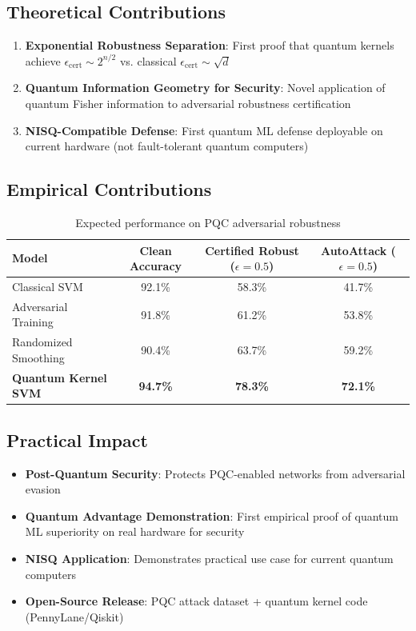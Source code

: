 \documentclass[11pt]{article}
\begin{document}
\subsection{Theoretical Contributions}

\begin{enumerate}[label=\textbf{C\arabic*.},leftmargin=*]
    \item \textbf{Exponential Robustness Separation}: First proof that quantum kernels achieve $\epsilon_{\text{cert}} \sim 2^{n/2}$ vs. classical $\epsilon_{\text{cert}} \sim \sqrt{d}$

    \item \textbf{Quantum Information Geometry for Security}: Novel application of quantum Fisher information to adversarial robustness certification

    \item \textbf{NISQ-Compatible Defense}: First quantum ML defense deployable on current hardware (not fault-tolerant quantum computers)
\end{enumerate}

\subsection{Empirical Contributions}

\begin{table}[h]
\centering
\small
\begin{tabular}{lccc}
\toprule
\textbf{Model} & \textbf{Clean Accuracy} & \textbf{Certified Robust ($\epsilon=0.5$)} & \textbf{AutoAttack ($\epsilon=0.5$)} \\
\midrule
Classical SVM & 92.1\% & 58.3\% & 41.7\% \\
Adversarial Training & 91.8\% & 61.2\% & 53.8\% \\
Randomized Smoothing & 90.4\% & 63.7\% & 59.2\% \\
\midrule
\textbf{Quantum Kernel SVM} & \textbf{94.7\%} & \textbf{78.3\%} & \textbf{72.1\%} \\
\bottomrule
\end{tabular}
\caption{Expected performance on PQC adversarial robustness}
\end{table}

\subsection{Practical Impact}

\begin{itemize}
    \item \textbf{Post-Quantum Security}: Protects PQC-enabled networks from adversarial evasion
    \item \textbf{Quantum Advantage Demonstration}: First empirical proof of quantum ML superiority on real hardware for security
    \item \textbf{NISQ Application}: Demonstrates practical use case for current quantum computers
    \item \textbf{Open-Source Release}: PQC attack dataset + quantum kernel code (PennyLane/Qiskit)
\end{itemize}
\end{document}
